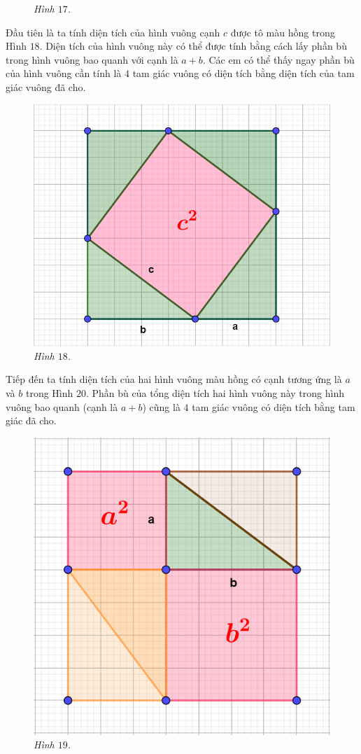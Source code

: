 \begin{multicols}{2}
\begin{figure}[H]
		\caption{\small\textit{\color{toancuabi}Hình $17$.}}
		\vspace*{-10pt}
	\end{figure}
	Đầu tiên là ta tính diện tích của hình vuông cạnh $c$ được tô màu hồng trong Hình $18$. Diện tích của hình vuông này có thể được tính bằng cách lấy phần bù trong hình vuông bao quanh với cạnh là $a+b$. Các em có thể thấy ngay phần bù của hình vuông cần tính là $4$ tam giác vuông có diện tích bằng diện tích của tam giác vuông đã cho.
	\begin{figure}[H]
		\centering
		\vspace*{-5pt}
		\captionsetup{labelformat= empty, justification=centering}
		\includegraphics[width=0.5\linewidth]{18}
		\caption{\small\textit{\color{toancuabi}Hình $18$.}}
		\vspace*{-5pt}
	\end{figure}
	Tiếp đến ta tính diện tích của hai hình vuông màu hồng có cạnh tương ứng là $a$ và $b$ trong Hình $20$. Phần bù của tổng diện tích hai hình vuông này trong hình vuông bao quanh (cạnh là $a+b$) cũng là $4$ tam giác vuông có diện tích bằng tam giác đã cho.
	\begin{figure}[H]
		\centering
		\vspace*{-5pt}
		\captionsetup{labelformat= empty, justification=centering}
		\includegraphics[width=0.48\linewidth]{19}
		\caption{\small\textit{\color{toancuabi}Hình $19$.}}

\end{figure}
\end{multicols}

